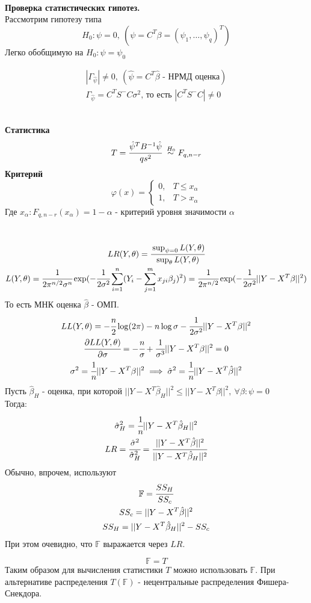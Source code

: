 \documentclass[main.tex]{subfiles}
\begin{document}
~\\
\textbf{Проверка статистических гипотез.} ~\\
Рассмотрим гипотезу типа
\[H_0:\psi = 0,\ (\psi = C^T\beta = (\psi_1,\dots,\psi_q)^T)\]
Легко обобщимую на $H_0: \psi = \psi_0$
\begin{suggestion}
	\begin{gather*}
		|\Gamma_{\hat\psi}| \neq 0,\ (\hat\psi = C^T\hat\beta \text{ - НРМД оценка})\\
		\Gamma_{\hat\psi} = C^TS^-C\sigma^2 \text{, то есть } |C^TS^-C| \neq 0
	\end{gather*}
\end{suggestion}
\begin{definition} ~\\
	\textbf{Статистика}
	\[T = \cfrac{\hat\psi^TB^{-1}\hat\psi}{qs^2}\, \overset{\,H_0}{\sim} F_{q,n-r}\]
	\textbf{Критерий}
	\[\varphi(x) = \begin{cases}
		0, & T \leq x_\alpha\\
		1, & T > x_\alpha
	\end{cases}\]
	Где $x_\alpha: F_{q,n-r}(x_\alpha) = 1 -\alpha$ - критерий уровня значимости $\alpha$
\end{definition}
\begin{definition} ~\\
	\begin{gather*}
		LR(Y,\theta) = \cfrac{\sup_{\psi=0}L(Y,\theta)}{\sup_\theta L(Y,\theta)}\\
		L(Y,\theta) = \cfrac{1}{2\pi^{n/2}\sigma^n}\exp(-\cfrac{1}{2\sigma^2}\sum_{i=1}^n(Y_i-\sum_{j=1}^mx_{ji}\beta_j)^2) = \cfrac{1}{2\pi^{n/2}}\exp(-\cfrac{1}{2\sigma^2}||Y - X^T\beta||^2)
	\end{gather*}
	То есть МНК оценка $\hat\beta$ - ОМП.
	\begin{gather*}
		LL(Y,\theta)= -\cfrac{n}{2}\log(2\pi)-n\log\sigma-\cfrac{1}{2\sigma^2}||Y - X^T\beta||^2\\
		\cfrac{\partial LL(Y,\theta)}{\partial \sigma} = -\cfrac{n}{\sigma} + \cfrac{1}{\sigma^3}||Y-X^T\beta||^2=0\\
		\sigma^2 = \cfrac{1}{n}||Y-X^T\beta||^2 \implies \hat\sigma^2 = \cfrac{1}{n}||Y - X^T\hat\beta||^2
	\end{gather*}
	Пусть $\hat\beta_H$ - оценка, при которой $||Y - X^T\hat\beta_H||^2 \leq ||Y - X^T\beta||^2,\ \forall \beta: \psi = 0$\\
	Тогда:
	\begin{gather*}
		\hat\sigma_H^2 = \cfrac{1}{n}||Y - X^T\hat\beta_H||^2\\
		LR = \cfrac{\hat\sigma^2}{\hat\sigma_H^2} = \cfrac{||Y - X^T\hat\beta||^2}{||Y - X^T\hat\beta_H||^2}
	\end{gather*}
	Обычно, впрочем, используют
	\begin{gather*}
		\mathbb{F} = \cfrac{SS_H}{SS_c}\\
		SS_c = ||Y - X^T\hat\beta||^2\\
		SS_H = ||Y - X^T\hat\beta_H||^2 - SS_c\\
	\end{gather*}
	При этом очевидно, что $\mathbb{F}$ выражается через $LR$.
\end{definition}
\begin{statement}
	\[\mathbb{F} = T\]
	Таким образом для вычисления статистики $T$ можно использовать $\mathbb{F}$.
	При альтернативе распределения $T(\mathbb{F})$ - нецентральные распределения Фишера-Снекдора.
\end{statement}
\end{document}
